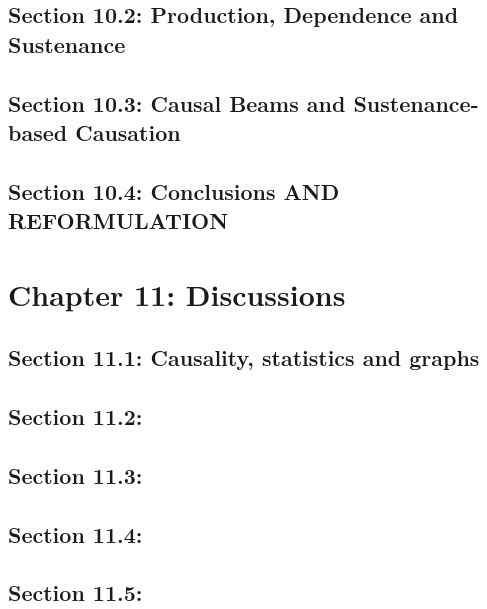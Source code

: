 \documentclass[oneside]{book}
\begin{document}


\section{Section 10.2: Production, Dependence and Sustenance}



\section{Section 10.3: Causal Beams and Sustenance-based Causation}



\section{Section 10.4: Conclusions AND REFORMULATION}



\chapter{Chapter 11: Discussions}

\section{Section 11.1: Causality, statistics and graphs}



\section{Section 11.2: }



\section{Section 11.3: }



\section{Section 11.4: }



\section{Section 11.5: }
\end{document}
